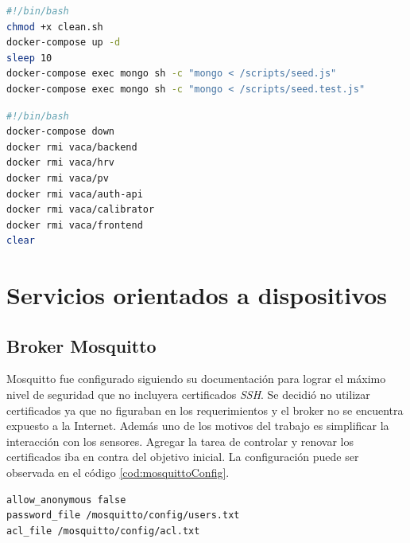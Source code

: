 \begin{lstlisting}[language=bash,label=cod:bashStart,caption=Guión de inicialización.]
#!/bin/bash
chmod +x clean.sh
docker-compose up -d
sleep 10
docker-compose exec mongo sh -c "mongo < /scripts/seed.js"
docker-compose exec mongo sh -c "mongo < /scripts/seed.test.js"
\end{lstlisting}

\begin{lstlisting}[language=bash,label=cod:bashClean,caption=Guión de limpieza.]
#!/bin/bash
docker-compose down
docker rmi vaca/backend
docker rmi vaca/hrv
docker rmi vaca/pv
docker rmi vaca/auth-api
docker rmi vaca/calibrator
docker rmi vaca/frontend
clear
\end{lstlisting}


\section{Servicios orientados a dispositivos}

\subsection{Broker Mosquitto}

Mosquitto fue configurado siguiendo su documentación para lograr el máximo nivel de seguridad que no incluyera certificados \emph{SSH}.
Se decidió no utilizar certificados ya que no figuraban en los requerimientos y el broker no se encuentra expuesto a la Internet.
Además uno de los motivos del trabajo es simplificar la interacción con los sensores.
Agregar la tarea de controlar y renovar los certificados iba en contra del objetivo inicial.
La configuración puede ser observada en el código \ref{cod:mosquittoConfig}.

\begin{lstlisting}[label=cod:mosquittoConfig,caption=Archivo mosquitto.conf]
allow_anonymous false
password_file /mosquitto/config/users.txt
acl_file /mosquitto/config/acl.txt
\end{lstlisting}

